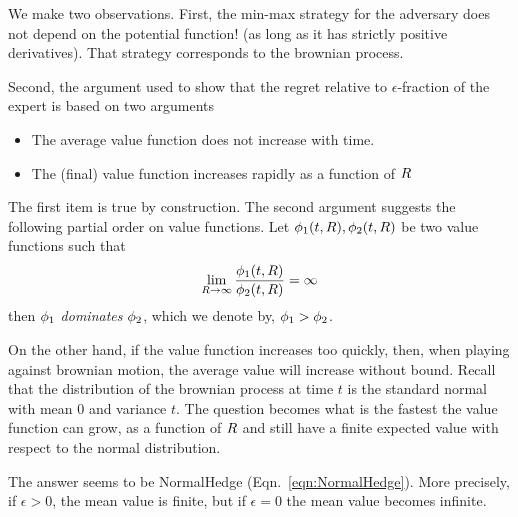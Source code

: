 \documentclass{article}[12pt]
\begin{document}
We make two observations. First, the min-max strategy for the
adversary does not depend on the potential function! (as long as it
has strictly positive derivatives). That strategy corresponds to the
brownian process.

Second, the argument used to show that the regret relative to
$\epsilon$-fraction of the expert is based on two arguments
\begin{itemize}
\item The average value function does not increase with time.
\item The (final) value function increases rapidly as a function of $R$
\end{itemize}
The first item is true by construction. The second argument suggests
the following partial order on value functions. Let
$\phi_1(t,R),\phi_2(t,R)$ be two value functions such that
\[
\lim_{R \to \infty} \frac{\phi_1(t,R)}{\phi_2(t,R)} = \infty  
\]
then $\phi_1$ {\em dominates} $\phi_2$, which we denote by, $\phi_1 > \phi_2$.

On the other hand, if the value function increases too quickly, then,
when playing against brownian motion, the average value will increase
without bound.  Recall that the distribution of the brownian process
at time $t$ is the standard normal with mean 0 and variance $t$.
The question becomes what is the fastest the value
function can grow, as a function of $R$ and still have a finite
expected value with respect to the normal distribution.

The answer seems to be NormalHedge (Eqn.~\ref{eqn:NormalHedge}). More
precisely, if $\epsilon>0$, the mean value is finite, but if
$\epsilon=0$ the mean value becomes infinite.




\appendix
\end{document}
